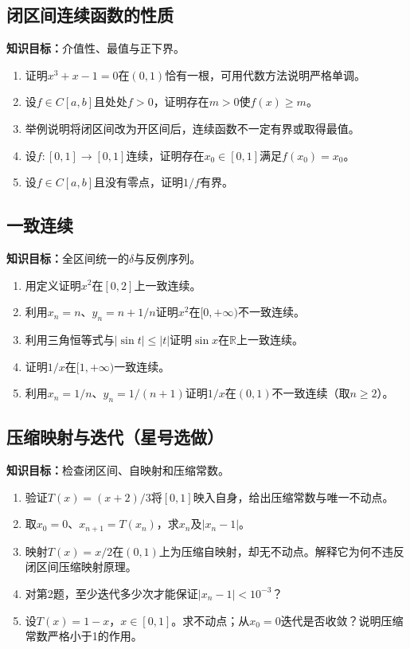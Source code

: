 \documentclass[11pt,a4paper,fontset=fandol]{ctexrep}
\newcommand{\goal}[1]{\textbf{知识目标：}#1\par}
\begin{document}
\subsection{闭区间连续函数的性质}
\goal{介值性、最值与正下界。}
\begin{enumerate}
\item 证明$x^3+x-1=0$在$(0,1)$恰有一根，可用代数方法说明严格单调。
\item 设$f\in C[a,b]$且处处$f>0$，证明存在$m>0$使$f(x)\ge m$。
\item 举例说明将闭区间改为开区间后，连续函数不一定有界或取得最值。
\item 设$f:[0,1]\to[0,1]$连续，证明存在$x_0\in[0,1]$满足$f(x_0)=x_0$。
\item 设$f\in C[a,b]$且没有零点，证明$1/f$有界。
\end{enumerate}
\subsection{一致连续}
\goal{全区间统一的$\delta$与反例序列。}
\begin{enumerate}
\item 用定义证明$x^2$在$[0,2]$上一致连续。
\item 利用$x_n=n$、$y_n=n+1/n$证明$x^2$在$[0,+\infty)$不一致连续。
\item 利用三角恒等式与$|\sin t|\le|t|$证明$\sin x$在$\mathbb R$上一致连续。
\item 证明$1/x$在$[1,+\infty)$一致连续。
\item 利用$x_n=1/n$、$y_n=1/(n+1)$证明$1/x$在$(0,1)$不一致连续（取$n\ge2$）。
\end{enumerate}
\subsection{压缩映射与迭代（星号选做）}
\goal{检查闭区间、自映射和压缩常数。}
\begin{enumerate}
\item 验证$T(x)=(x+2)/3$将$[0,1]$映入自身，给出压缩常数与唯一不动点。
\item 取$x_0=0$、$x_{n+1}=T(x_n)$，求$x_n$及$|x_n-1|$。
\item 映射$T(x)=x/2$在$(0,1)$上为压缩自映射，却无不动点。解释它为何不违反闭区间压缩映射原理。
\item 对第2题，至少迭代多少次才能保证$|x_n-1|<10^{-3}$？
\item 设$T(x)=1-x$，$x\in[0,1]$。求不动点；从$x_0=0$迭代是否收敛？说明压缩常数严格小于1的作用。
\end{enumerate}
\end{document}
